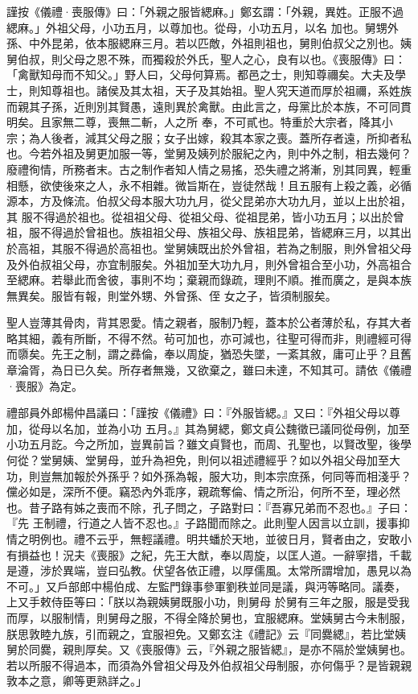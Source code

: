 \begin{pinyinscope}
 謹按《儀禮·喪服傳》曰：「外親之服皆緦麻。」鄭玄謂：「外親，異姓。正服不過緦麻。」外祖父母，小功五月，以尊加也。從母，小功五月，以名
 加也。舅甥外孫、中外昆弟，依本服緦麻三月。若以匹敵，外祖則祖也，舅則伯叔父之別也。姨舅伯叔，則父母之恩不殊，而獨殺於外氏，聖人之心，良有以也。《喪服傳》曰：「禽獸知母而不知父。」野人曰，父母何算焉。都邑之士，則知尊禰矣。大夫及學士，則知尊祖也。諸侯及其太祖，天子及其始祖。聖人究天道而厚於祖禰，系姓族而親其子孫，近則別其賢愚，遠則異於禽獸。由此言之，母黨比於本族，不可同貫明矣。且家無二尊，喪無二斬，人之所
 奉，不可貳也。特重於大宗者，降其小宗；為人後者，減其父母之服；女子出嫁，殺其本家之喪。蓋所存者遠，所抑者私也。今若外祖及舅更加服一等，堂舅及姨列於服紀之內，則中外之制，相去幾何？廢禮徇情，所務者末。古之制作者知人情之易搖，恐失禮之將漸，別其同異，輕重相懸，欲使後來之人，永不相雜。微旨斯在，豈徒然哉！且五服有上殺之義，必循源本，方及條流。伯叔父母本服大功九月，從父昆弟亦大功九月，並以上出於祖，其
 服不得過於祖也。從祖祖父母、從祖父母、從祖昆弟，皆小功五月；以出於曾祖，服不得過於曾祖也。族祖祖父母、族祖父母、族祖昆弟，皆緦麻三月，以其出於高祖，其服不得過於高祖也。堂舅姨既出於外曾祖，若為之制服，則外曾祖父母及外伯叔祖父母，亦宜制服矣。外祖加至大功九月，則外曾祖合至小功，外高祖合至緦麻。若舉此而舍彼，事則不均；棄親而錄疏，理則不順。推而廣之，是與本族無異矣。服皆有報，則堂外甥、外曾孫、侄
 女之子，皆須制服矣。



 聖人豈薄其骨肉，背其恩愛。情之親者，服制乃輕，蓋本於公者薄於私，存其大者略其細，義有所斷，不得不然。茍可加也，亦可減也，往聖可得而非，則禮經可得而隳矣。先王之制，謂之彞倫，奉以周旋，猶恐失墜，一紊其敘，庸可止乎？且舊章淪胥，為日已久矣。所存者無幾，又欲棄之，雖曰未達，不知其可。請依《儀禮·喪服》為定。



 禮部員外郎楊仲昌議曰：「謹按《儀禮》曰：『外服皆緦。』又曰：『外祖父母以尊加，從母以名加，並為小功
 五月。』其為舅緦，鄭文貞公魏徵已議同從母例，加至小功五月訖。今之所加，豈異前旨？雖文貞賢也，而周、孔聖也，以賢改聖，後學何從？堂舅姨、堂舅母，並升為袒免，則何以祖述禮經乎？如以外祖父母加至大功，則豈無加報於外孫乎？如外孫為報，服大功，則本宗庶孫，何同等而相淺乎？儻必如是，深所不便。竊恐內外乖序，親疏奪倫、情之所沿，何所不至，理必然也。昔子路有姊之喪而不除，孔子問之，子路對曰：『吾寡兄弟而不忍也。』子曰：『先
 王制禮，行道之人皆不忍也。』子路聞而除之。此則聖人因言以立訓，援事抑情之明例也。禮不云乎，無輕議禮。明共蟠於天地，並彼日月，賢者由之，安敢小有損益也！況夫《喪服》之紀，先王大猷，奉以周旋，以匡人道。一辭寧措，千載是遵，涉於異端，豈曰弘教。伏望各依正禮，以厚儒風。太常所謂增加，愚見以為不可。」又戶部郎中楊伯成、左監門錄事參軍劉秩並同是議，與沔等略同。議奏，上又手敕侍臣等曰：「朕以為親姨舅既服小功，則舅母
 於舅有三年之服，服是受我而厚，以服制情，則舅母之服，不得全降於舅也，宜服緦麻。堂姨舅古今未制服，朕思敦睦九族，引而親之，宜服袒免。又鄭玄注《禮記》云『同爨緦』，若比堂姨舅於同爨，親則厚矣。又《喪服傳》云，『外親之服皆緦』，是亦不隔於堂姨舅也。若以所服不得過本，而須為外曾祖父母及外伯叔祖父母制服，亦何傷乎？是皆親親敦本之意，卿等更熟詳之。」




\end{pinyinscope}
